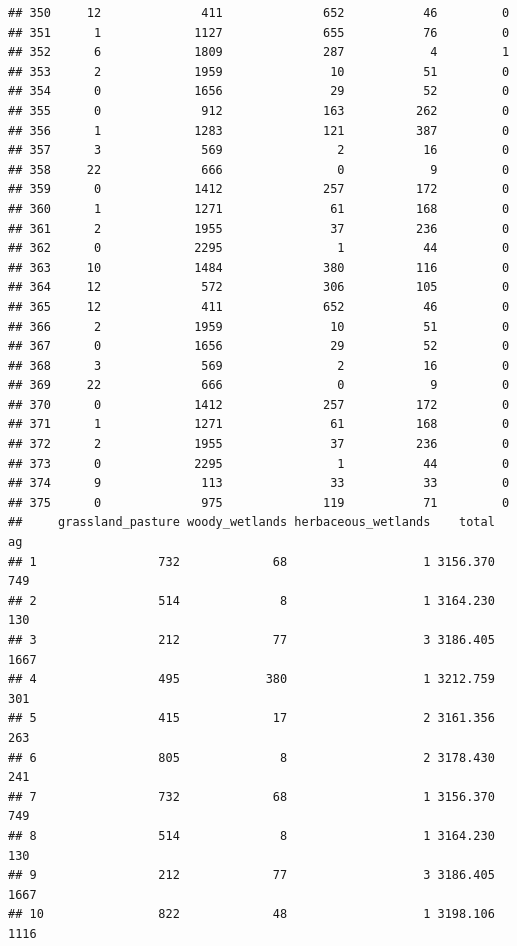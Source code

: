 \documentclass[
]{article}
\begin{document}
\begin{verbatim}
## 350     12              411              652           46         0
## 351      1             1127              655           76         0
## 352      6             1809              287            4         1
## 353      2             1959               10           51         0
## 354      0             1656               29           52         0
## 355      0              912              163          262         0
## 356      1             1283              121          387         0
## 357      3              569                2           16         0
## 358     22              666                0            9         0
## 359      0             1412              257          172         0
## 360      1             1271               61          168         0
## 361      2             1955               37          236         0
## 362      0             2295                1           44         0
## 363     10             1484              380          116         0
## 364     12              572              306          105         0
## 365     12              411              652           46         0
## 366      2             1959               10           51         0
## 367      0             1656               29           52         0
## 368      3              569                2           16         0
## 369     22              666                0            9         0
## 370      0             1412              257          172         0
## 371      1             1271               61          168         0
## 372      2             1955               37          236         0
## 373      0             2295                1           44         0
## 374      9              113               33           33         0
## 375      0              975              119           71         0
##     grassland_pasture woody_wetlands herbaceous_wetlands    total   ag
## 1                 732             68                   1 3156.370  749
## 2                 514              8                   1 3164.230  130
## 3                 212             77                   3 3186.405 1667
## 4                 495            380                   1 3212.759  301
## 5                 415             17                   2 3161.356  263
## 6                 805              8                   2 3178.430  241
## 7                 732             68                   1 3156.370  749
## 8                 514              8                   1 3164.230  130
## 9                 212             77                   3 3186.405 1667
## 10                822             48                   1 3198.106 1116

\end{verbatim}
\end{document}
